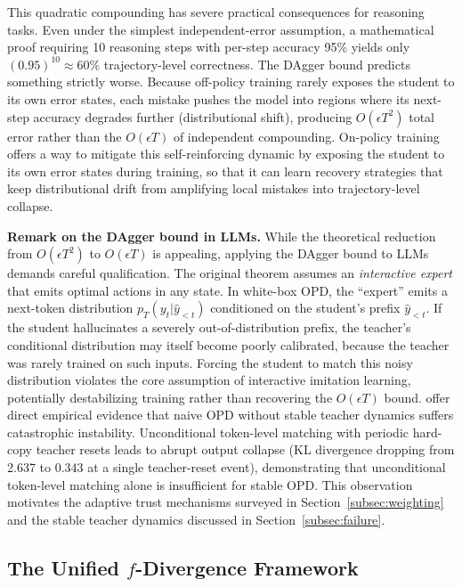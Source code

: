 \documentclass{article} %
\newcommand{\pteacher}{p_T}
\begin{document}
This quadratic compounding has severe practical consequences for reasoning tasks. Even under the simplest independent-error assumption, a mathematical proof requiring 10 reasoning steps with per-step accuracy 95\% yields only $(0.95)^{10} \approx 60\%$ trajectory-level correctness. The DAgger bound predicts something strictly worse. Because off-policy training rarely exposes the student to its own error states, each mistake pushes the model into regions where its next-step accuracy degrades further (distributional shift), producing $O(\epsilon T^2)$ total error rather than the $O(\epsilon T)$ of independent compounding. On-policy training offers a way to mitigate this self-reinforcing dynamic by exposing the student to its own error states during training, so that it can learn recovery strategies that keep distributional drift from amplifying local mistakes into trajectory-level collapse.

\textbf{Remark on the DAgger bound in LLMs.} While the theoretical reduction from $O(\epsilon T^2)$ to $O(\epsilon T)$ is appealing, applying the DAgger bound to LLMs demands careful qualification. The original theorem assumes an \emph{interactive expert} that emits optimal actions in any state. In white-box OPD, the ``expert'' emits a next-token distribution $\pteacher(y_t | \hat{y}_{<t})$ conditioned on the student's prefix $\hat{y}_{<t}$. If the student hallucinates a severely out-of-distribution prefix, the teacher's conditional distribution may itself become poorly calibrated, because the teacher was rarely trained on such inputs. Forcing the student to match this noisy distribution violates the core assumption of interactive imitation learning, potentially destabilizing training rather than recovering the $O(\epsilon T)$ bound. \citet{2605.02943} offer direct empirical evidence that naive OPD without stable teacher dynamics suffers catastrophic instability. Unconditional token-level matching with periodic hard-copy teacher resets leads to abrupt output collapse (KL divergence dropping from 2.637 to 0.343 at a single teacher-reset event), demonstrating that unconditional token-level matching alone is insufficient for stable OPD. This observation motivates the adaptive trust mechanisms surveyed in Section~\ref{subsec:weighting} and the stable teacher dynamics discussed in Section~\ref{subsec:failure}.

\subsection{The Unified \texorpdfstring{$f$}{f}-Divergence Framework}
\label{subsec:f-div}
\end{document}
